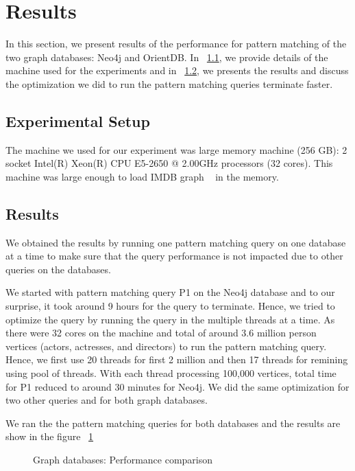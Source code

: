 
\section{Results}
In this section, we present results of the performance for pattern matching of the two graph databases: Neo4j and OrientDB. In ~\ref{setup}, we provide details of the machine used for the experiments and in ~\ref{result}, we presents the results and discuss the optimization we did to run the pattern matching queries terminate faster.

\subsection{Experimental Setup}
\label{setup}

The machine we used for our experiment was large memory machine (256 GB): 2 socket Intel(R) Xeon(R) CPU E5-2650 @ 2.00GHz processors (32 cores). This machine was large enough to load IMDB graph ~\cite{IMDb96:online} in the memory.

\subsection{Results}
\label{result}
We obtained the results by running one pattern matching query on one database at a time to make sure that the query performance is not impacted due to other queries on the databases.

We started with pattern matching query P1 on the Neo4j database and to our surprise, it took around 9 hours for the query to terminate. Hence, we tried to optimize the query by running the query in the multiple threads at a time. As there were 32 cores on the machine and total of around 3.6 million person vertices (actors, actresses, and directors) to run the pattern matching query. Hence, we first use 20 threads for first 2 million and then 17 threads for remining using pool of threads. With each thread processing 100,000 vertices, total time for P1 reduced to around 30 minutes for Neo4j. We did the same optimization for two other queries and for both graph databases.

We ran the the pattern matching queries for both databases and the results are show in the figure ~\ref{fig:comparsion}

\begin{figure}[h!]
	\centering
	\caption{Graph databases: Performance comparison}
	\label{fig:comparsion}
	\centering
\end{figure}

